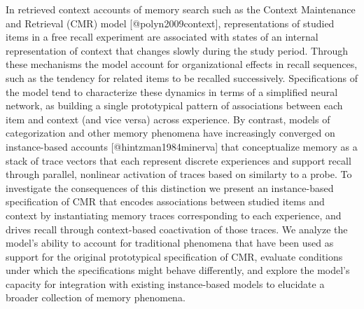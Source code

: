 In retrieved context accounts of memory search such as the Context Maintenance and Retrieval (CMR) model [@polyn2009context], representations of studied items in a free recall experiment are associated with states of an internal representation of context that changes slowly during the study period. Through these mechanisms the model account for organizational effects in recall sequences, such as the tendency for related items to be recalled successively. Specifications of the model tend to characterize these dynamics in terms of a simplified neural network, as building a single prototypical pattern of associations between each item and context (and vice versa) across experience. By contrast, models of categorization and other memory phenomena have increasingly converged on instance-based accounts [@hintzman1984minerva] that conceptualize memory as a stack of trace vectors that each represent discrete experiences and support recall through parallel, nonlinear activation of traces based on similarty to a probe. To investigate the consequences of this distinction we present an instance-based specification of CMR that encodes associations between studied items and context by instantiating memory traces corresponding to each experience, and drives recall through context-based coactivation of those traces. We analyze the model's ability to account for traditional phenomena that have been used as support for the original prototypical specification of CMR, evaluate conditions under which the specifications might behave differently, and explore the model's capacity for integration with existing instance-based models to elucidate a broader collection of memory phenomena.\relax